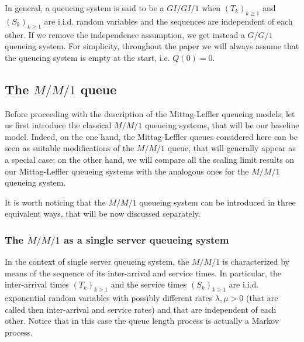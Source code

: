 \documentclass[]{amsart}
\numberwithin{equation}{section}
\theoremstyle{remark}
\theoremstyle{definition}
\begin{document}
In general, a queueing system is said to be a $GI/GI/1$ when $(T_k)_{k \ge 1}$ and $(S_k)_{k \ge 1}$ are i.i.d. random variables and the sequences are independent of each other. If we remove the independence assumption, we get instead a $G/G/1$ queueing system. {For simplicity, throughout the paper we will always assume that the queueing system is empty at the start, i.e. $Q(0)=0$.}
\subsection{The $M/M/1$ queue}\label{subs:MM1}
{Before proceeding with the description of the Mittag-Leffler queueing models, let us first introduce the classical $M/M/1$ queueing systems, that will be our baseline model. Indeed, on the one hand, the Mittag-Leffler queues considered here can be seen as suitable modifications of the $M/M/1$ queue, that will generally appear as a special case; on the other hand, we will compare all the scaling limit results on our Mittag-Leffler queueing systems with the analogous ones for the $M/M/1$ queueing system.}

{It is worth noticing that the $M/M/1$ queueing system can be introduced in three equivalent ways, that will be now discussed separately.}

\subsubsection{The $M/M/1$ as a single server queueing system}
{In the context of single server queueing system, the $M/M/1$ is characterized by means of the sequence of its inter-arrival and service times. In particular, the inter-arrival times $(T_k)_{k \ge 1}$ and the service times $(S_k)_{k \ge 1}$ are i.i.d. exponential random variables with possibly different rates $\lambda,\mu>0$ (that are called then inter-arrival and service rates) and that are independent of each other. Notice that in this case the queue length process is actually a Markov process.}
\end{document}
